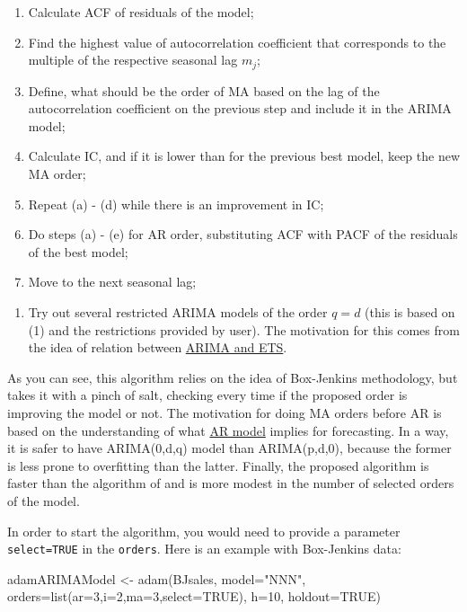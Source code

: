 \documentclass[
]{book}
\newenvironment{Shaded}{\begin{snugshade}}{\end{snugshade}}
\newcommand{\AttributeTok}[1]{\textcolor[rgb]{0.77,0.63,0.00}{#1}}
\newcommand{\ConstantTok}[1]{\textcolor[rgb]{0.00,0.00,0.00}{#1}}
\newcommand{\DecValTok}[1]{\textcolor[rgb]{0.00,0.00,0.81}{#1}}
\newcommand{\FunctionTok}[1]{\textcolor[rgb]{0.00,0.00,0.00}{#1}}
\newcommand{\NormalTok}[1]{#1}
\newcommand{\OtherTok}[1]{\textcolor[rgb]{0.56,0.35,0.01}{#1}}
\newcommand{\StringTok}[1]{\textcolor[rgb]{0.31,0.60,0.02}{#1}}
\providecommand{\tightlist}{%
  \setlength{\itemsep}{0pt}\setlength{\parskip}{0pt}}
\theoremstyle{definition}
\theoremstyle{definition}
\theoremstyle{definition}
\theoremstyle{definition}
\theoremstyle{remark}
\begin{document}
\begin{enumerate}
\def\labelenumi{\alph{enumi}.}
\tightlist
\item
  Calculate ACF of residuals of the model;
\item
  Find the highest value of autocorrelation coefficient that corresponds to the multiple of the respective seasonal lag \(m_j\);
\item
  Define, what should be the order of MA based on the lag of the autocorrelation coefficient on the previous step and include it in the ARIMA model;
\item
  Calculate IC, and if it is lower than for the previous best model, keep the new MA order;
\item
  Repeat (a) - (d) while there is an improvement in IC;
\item
  Do steps (a) - (e) for AR order, substituting ACF with PACF of the residuals of the best model;
\item
  Move to the next seasonal lag;
\end{enumerate}

\begin{enumerate}
\def\labelenumi{\arabic{enumi}.}
\setcounter{enumi}{2}
\tightlist
\item
  Try out several restricted ARIMA models of the order \(q=d\) (this is based on (1) and the restrictions provided by user). The motivation for this comes from the idea of relation between \protect\hyperlink{ARIMAandETS}{ARIMA and ETS}.
\end{enumerate}

As you can see, this algorithm relies on the idea of Box-Jenkins methodology, but takes it with a pinch of salt, checking every time if the proposed order is improving the model or not. The motivation for doing MA orders before AR is based on the understanding of what \protect\hyperlink{AR}{AR model} implies for forecasting. In a way, it is safer to have ARIMA(0,d,q) model than ARIMA(p,d,0), because the former is less prone to overfitting than the latter. Finally, the proposed algorithm is faster than the algorithm of \citet{Svetunkov2019} and is more modest in the number of selected orders of the model.

In order to start the algorithm, you would need to provide a parameter \texttt{select=TRUE} in the \texttt{orders}. Here is an example with Box-Jenkins data:

\begin{Shaded}
\begin{Highlighting}[]
\NormalTok{adamARIMAModel }\OtherTok{\textless{}{-}} \FunctionTok{adam}\NormalTok{(BJsales, }\AttributeTok{model=}\StringTok{"NNN"}\NormalTok{,}
                       \AttributeTok{orders=}\FunctionTok{list}\NormalTok{(}\AttributeTok{ar=}\DecValTok{3}\NormalTok{,}\AttributeTok{i=}\DecValTok{2}\NormalTok{,}\AttributeTok{ma=}\DecValTok{3}\NormalTok{,}\AttributeTok{select=}\ConstantTok{TRUE}\NormalTok{),}
                       \AttributeTok{h=}\DecValTok{10}\NormalTok{, }\AttributeTok{holdout=}\ConstantTok{TRUE}\NormalTok{)}
\end{Highlighting}
\end{Shaded}
\end{document}
